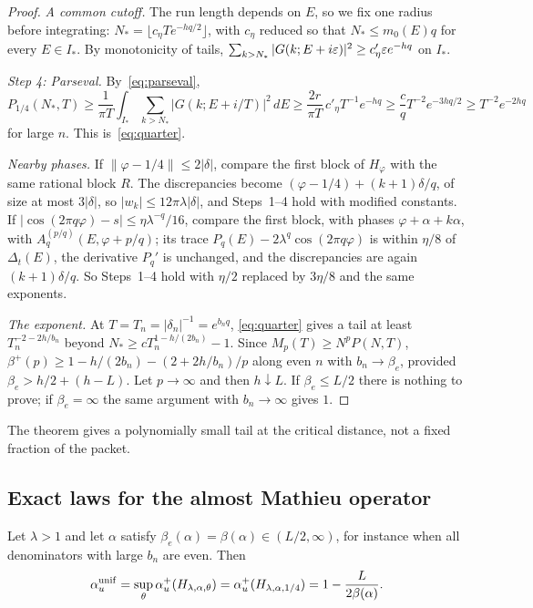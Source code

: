\begin{proof}
\emph{A common cutoff.} The run length depends on $E$, so we fix one radius before integrating: $N_*=\lfloor c_\eta Te^{-hq/2}\rfloor$, with $c_\eta$ reduced so that $N_*\le m_0(E)q$ for every $E\in I_*$. By monotonicity of tails, $\sum_{k>N_*}|G(k;E+i\varepsilon)|^2\ge c'_\eta\varepsilon e^{-hq}$ on $I_*$.

\emph{Step 4: Parseval.} By~\eqref{eq:parseval},
\[
P_{1/4}(N_*,T)\ge\frac1{\pi T}\int_{I_*}\sum_{k>N_*}|G(k;E+i/T)|^2\,dE\ge\frac{2r}{\pi T}\,c'_\eta T^{-1}e^{-hq}\ge\frac{c}{q}T^{-2}e^{-3hq/2}\ge T^{-2}e^{-2hq}
\]
for large $n$. This is~\eqref{eq:quarter}.

\emph{Nearby phases.} If $\|\varphi-1/4\|\le2|\delta|$, compare the first block of $H_\varphi$ with the same rational block $R$. The discrepancies become $(\varphi-1/4)+(k+1)\delta/q$, of size at most $3|\delta|$, so $|w_k|\le12\pi\lambda|\delta|$, and Steps~1--4 hold with modified constants. If $|\cos(2\pi q\varphi)-s|\le\eta\lambda^{-q}/16$, compare the first block, with phases $\varphi+\alpha+k\alpha$, with $A^{(p/q)}_q(E,\varphi+p/q)$; its trace $P_q(E)-2\lambda^q\cos(2\pi q\varphi)$ is within $\eta/8$ of $\Delta_t(E)$, the derivative $P_q'$ is unchanged, and the discrepancies are again $(k+1)\delta/q$. So Steps~1--4 hold with $\eta/2$ replaced by $3\eta/8$ and the same exponents.

\emph{The exponent.} At $T=T_n=|\delta_n|^{-1}=e^{b_nq}$, \eqref{eq:quarter} gives a tail at least $T_n^{-2-2h/b_n}$ beyond $N_*\ge cT_n^{1-h/(2b_n)}-1$. Since $M_p(T)\ge N^pP(N,T)$, $\beta^+(p)\ge1-h/(2b_n)-(2+2h/b_n)/p$ along even $n$ with $b_n\to\beta_e$, provided $\beta_e>h/2+(h-L)$. Let $p\to\infty$ and then $h\downarrow L$. If $\beta_e\le L/2$ there is nothing to prove; if $\beta_e=\infty$ the same argument with $b_n\to\infty$ gives $1$.
\end{proof}

The theorem gives a polynomially small tail at the critical distance, not a fixed fraction of the packet.

\subsection{Exact laws for the almost Mathieu operator}

\begin{corollary}\label{cor:exactunif}
Let $\lambda>1$ and let $\alpha$ satisfy $\beta_e(\alpha)=\beta(\alpha)\in(L/2,\infty)$, for instance when all denominators with large $b_n$ are even. Then
\[
\alpha_u^{\mathrm{unif}}=\sup_\theta\alpha_u^+(H_{\lambda,\alpha,\theta})=\alpha_u^+(H_{\lambda,\alpha,1/4})=1-\frac{L}{2\beta(\alpha)} .
\]
\end{corollary}

